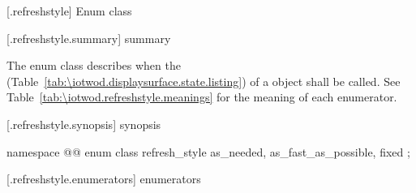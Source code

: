  [\iotwod.refreshstyle] {Enum class }

 [\iotwod.refreshstyle.summary] { summary}

\pnum
The  enum class describes when the  (Table~\ref{tab:\iotwod.displaysurface.state.listing}) of a  object shall be called. See Table~\ref{tab:\iotwod.refreshstyle.meanings} for the meaning of each  enumerator.

 [\iotwod.refreshstyle.synopsis] { synopsis}

\begin{codeblock}
namespace @\fullnamespace{}@ {
  enum class refresh_style {
    as_needed,
    as_fast_as_possible,
    fixed
  };
}
\end{codeblock}

 [\iotwod.refreshstyle.enumerators] { enumerators}

